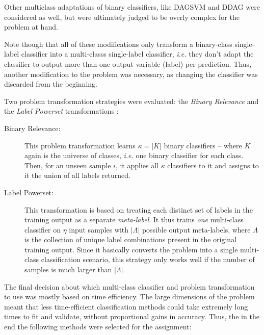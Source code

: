 \documentclass{kthreport}
\theoremstyle{definition}
\begin{document}
Other multiclass adaptations of binary classifiers, like DAGSVM \autocite{chen2009dagsvm} and DDAG \autocite{platt2000ddag} were considered as well, but were ultimately judged to be overly complex for the problem at hand.

Note though that all of these modifications only transform a binary-class single-label classifier into a multi-classs single-label classifier, \emph{i.e.} they don't adapt the classifier to output more than one output variable (label) per prediction.
Thus, another modification to the problem was necessary, as changing the classifier was discarded from the beginning.

Two problem transformation strategies were evaluated: the \emph{Binary Relevance} and the \emph{Label Powerset} transformations \autocite{tsoumakas2006multi}:

\begin{description}
    \item[Binary Relevance:] This problem transformation learns $\kappa = |K|$ binary classifiers -- where $K$ again is the universe of classes, \emph{i.e.} one binary classifier for each class. Then, for an unseen sample $i$, it applies all $\kappa$ classifiers to it and assigns to it the union of all labels returned.
    \item[Label Powerset:] This transformation is based on treating each distinct set of labels in the training output as a separate \emph{meta-label}. It thus trains \emph{one} multi-class classifier on $\eta$ input samples with $|\Lambda|$ possible output meta-labels, where $\Lambda$ is the collection of unique label combinations present in the original training output. 
    Since it basically converts the problem into a single multi-class classification scenario, this strategy only works well if the number of samples is much larger than $|\Lambda|$.
\end{description}

The final decision about which multi-class classifier and problem transformation to use was mostly based on time efficiency. The large dimensions of the problem meant that less time-efficient classification methods could take extremely long times to fit and validate, without proportional gains in accuracy. Thus, the in the end the following methods were selected for the assignment:
\end{document}
